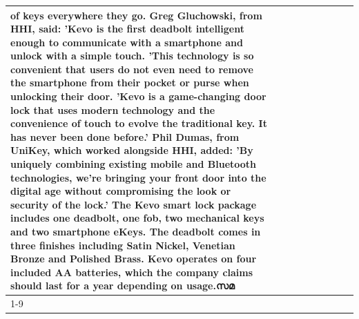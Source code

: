 \begin{table}[H]
\begin{tabular}{lllrlllll}
of keys everywhere they go. Greg Gluchowski, from HHI, said: 'Kevo is the first deadbolt intelligent enough to communicate with a smartphone and unlock with a simple touch. 'This technology is so convenient that users do not even need to remove the smartphone from their pocket or purse when unlocking their door. 'Kevo is a game-changing door lock that uses modern technology and the convenience of touch to evolve the traditional key. It has never been done before.' Phil Dumas, from UniKey, which worked alongside HHI, added: 'By uniquely combining existing mobile and Bluetooth technologies, we’re bringing your front door into the digital age without compromising the look or security of the lock.' The Kevo smart lock package includes one deadbolt, one fob, two mechanical keys and two smartphone eKeys. The deadbolt comes in three finishes including Satin Nickel, Venetian Bronze and Polished Brass. Kevo operates on four included AA batteries, which the company claims should last for a year depending on usage.സമ \\
\cline{1-9}

\end{tabular}
\end{table}
